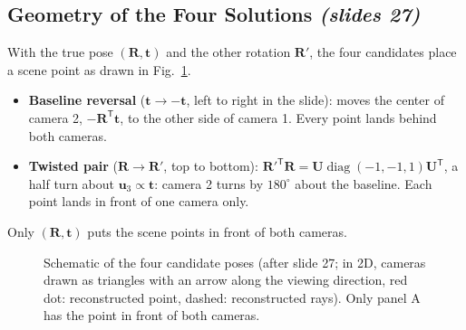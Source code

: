 \documentclass[11pt,a4paper]{article}
\newcommand{\slr}[1]{\texorpdfstring{\emph{(slides #1)}}{(slides #1)}}
\newcommand{\tr}{^{\mathsf T}}
\DeclareMathOperator{\diag}{diag}
\theoremstyle{definition}
\theoremstyle{plain}
\theoremstyle{remark}
\begin{document}
\subsection{Geometry of the Four Solutions \slr{27}}
With the true pose $(\bm R,\bm t)$ and the other rotation $\bm R'$, the four candidates place a scene point as drawn in Fig.~\ref{fig:four}.
\begin{itemize}
\item \textbf{Baseline reversal} ($\bm t\to-\bm t$, left to right in the slide): moves the center of camera 2, $-\bm R\tr\bm t$, to the other side of camera 1. Every point lands behind both cameras.
\item \textbf{Twisted pair} ($\bm R\to\bm R'$, top to bottom): $\bm R'^{\mathsf T}\bm R=\bm U\diag(-1,-1,1)\bm U\tr$, a half turn about $\bm u_3\propto\bm t$: camera 2 turns by $180^\circ$ about the baseline. Each point lands in front of one camera only.
\end{itemize}
Only $(\bm R,\bm t)$ puts the scene points in front of both cameras.

\newcommand{\camdraw}[3]{\begin{scope}[shift={(#1,#2)},rotate=#3]
 \fill[gray!25,draw=black] (0,0)--(-0.45,0.65)--(0.45,0.65)--cycle;
 \draw[-{Stealth},thick](0,0.65)--(0,1.25);\end{scope}}
\begin{figure}[H]
\centering
{}
\caption{Schematic of the four candidate poses (after slide 27; in 2D, cameras drawn as triangles with an arrow along the viewing direction, red dot: reconstructed point, dashed: reconstructed rays). Only panel A has the point in front of both cameras.}
\label{fig:four}
\end{figure}
\end{document}
